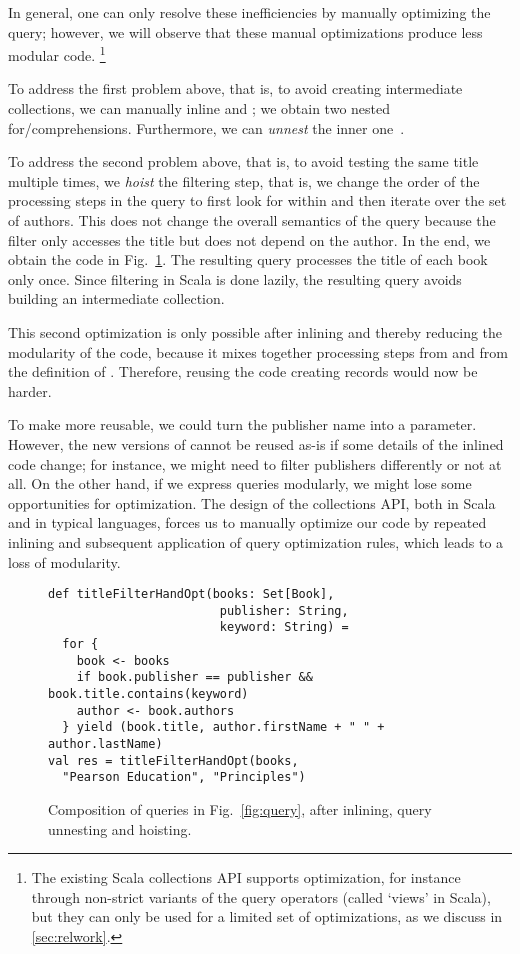 In general, one can only resolve these inefficiencies by manually optimizing the query; however, we will observe that these manual optimizations produce less modular code.%
\footnote{%
The existing Scala collections API supports optimization, for instance through non-strict variants of the query operators (called `views' in Scala), but they can only
be used for a limited set of optimizations, as we discuss in \cref{sec:relwork}.}

To address the first problem above, that is, to avoid creating intermediate collections, we can manually inline  and ; we obtain two nested for\-/comprehensions.
Furthermore, we can \emph{unnest} the inner one~\citep{Fegaras00}.

To address the second problem above, that is, to avoid testing the same title multiple times, we \emph{hoist} the filtering step, that is, we change the order of the processing steps in the query to first look for  within  and then iterate over the set of authors. This does not change the overall semantics of the query because the filter only accesses the title but does not depend on the author. In the end, we obtain the code in Fig.~\ref{fig:titleFilterho2}. The resulting query processes the title of each book only once. Since filtering in Scala is done lazily, the resulting query avoids building an intermediate collection.

This second optimization is only possible after inlining and thereby reducing the modularity of the code, because it mixes together processing steps from  and from the definition of . Therefore, reusing the code creating records would now be harder.

To make  more reusable, we could turn the publisher name into a parameter.
However, the new versions of  cannot be reused as-is if some details of the inlined code change; for instance, we might need to filter publishers differently or not at all. On the other hand, if we express queries modularly, we might lose some opportunities for optimization. The design of the collections API, both in Scala and in typical languages, forces us to manually optimize our code by repeated inlining and subsequent application of query optimization rules, which leads to a loss of modularity.

\begin{figure}[htb]
\begin{lstlisting}
def titleFilterHandOpt(books: Set[Book],
                        publisher: String,
                        keyword: String) =
  for {
    book <- books
    if book.publisher == publisher && book.title.contains(keyword)
    author <- book.authors
  } yield (book.title, author.firstName + " " + author.lastName)
val res = titleFilterHandOpt(books,
  "Pearson Education", "Principles")
\end{lstlisting}
\caption{Composition of queries in Fig.~\ref{fig:query}, after inlining, query unnesting and hoisting.}
\label{fig:titleFilterho2}
\end{figure}


